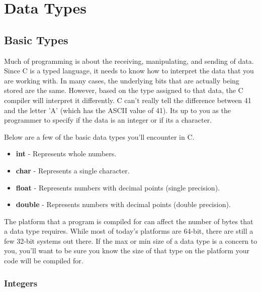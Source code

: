 \documentclass[../main.tex]{subfiles}
\begin{document}
	\chapter{Data Types}
	
	
	\section{Basic Types}
	
	Much of programming is about the receiving, manipulating, and sending of data.  Since C is a typed language, it needs to know how to interpret the data that you are working with.  In many cases, the underlying bits that are actually being stored are the same.  However, based on the type assigned to that data, the C compiler will interpret it differently.  C can't really tell the difference between 41 and the letter 'A' (which has the ASCII value of 41).  Its up to you as the programmer to specify if the data is an integer or if its a character.
	
	Below are a few of the basic data types you'll encounter in C.	
	\begin{itemize}
		\item \textbf{int}		-	Represents whole numbers.
		\item \textbf{char}		-	Represents a single character.
		\item \textbf{float}	-	Represents numbers with decimal points (single precision).
		\item \textbf{double} 	-	Represents numbers with decimal points (double precision).
	\end{itemize}

	The platform that a program is compiled for can affect the number of bytes that a data type requires.  While most of today's platforms are 64-bit, there are still a few 32-bit systems out there.  If the max or min size of a data type is a concern to you, you'll want to be sure you know the size of that type on the platform your code will be compiled for.
	\subsection{Integers}
	
\end{document}
